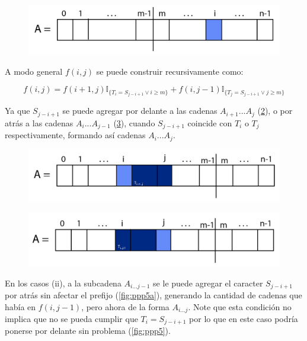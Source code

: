 \documentclass[a4paper]{article}
\begin{document}
    \begin{figure}[!h]
    	\label{fig:ppp2}
    	\centering
    	\includegraphics[width=0.7\linewidth]{ppp2}
    	\caption{}
    \end{figure}
     

    A modo general $f(i,j)$ se puede construir recursivamente como: 

    \begin{equation*}
        f(i,j) = f(i+1,j)\mathbb{I}_{ \{T_i = S_{j-i+1} \vee i \geq m \}}  +  f(i,j-1)\mathbb{I}_{ \{T_j = S_{j-i+1} \vee j \geq m \} } 
    \end{equation*}

    Ya que $S_{j-i+1}$ se puede agregar por delante a las cadenas $A_{i+1}...A_j$ (\ref{fig:ppp3}), o por atr\'as a las cadenas 
    $A_{i}...A_{j-1}$ (\ref{fig:ppp4}), cuando $S_{j-i+1}$ coincide con $T_i$ o $T_j$ respectivamente, formando as\'i cadenas $A_{i}...A_{j}$.\\
    
    \begin{figure}[h!]
    	\label{fig:ppp3}
    	\centering
    	\includegraphics[width=0.7\linewidth]{ppp3}
    	\caption{}
    \end{figure}
    \begin{figure}[h!]
        \label{fig:ppp4}
    	\centering
    	\includegraphics[width=0.7\linewidth]{ppp4}
    	\caption{}
    \end{figure}
    

    En los casos (ii), a la subcadena $A_{i...j-1}$ se le puede agregar el caracter $S_{j-i+1}$ por atr\'as sin afectar 
    el prefijo (\ref{fig:ppp5a}), generando la cantidad de cadenas que hab\'ia en $f(i,j-1)$, pero ahora de la forma $A_{i...j}$. Note que esta condición no implica que no se pueda cumplir que $T_{i} =  S_{j-i+1}$ por lo que en este caso podría ponerse por delante sin problema (\ref{fig:ppp5}).\\
    
\end{document}
